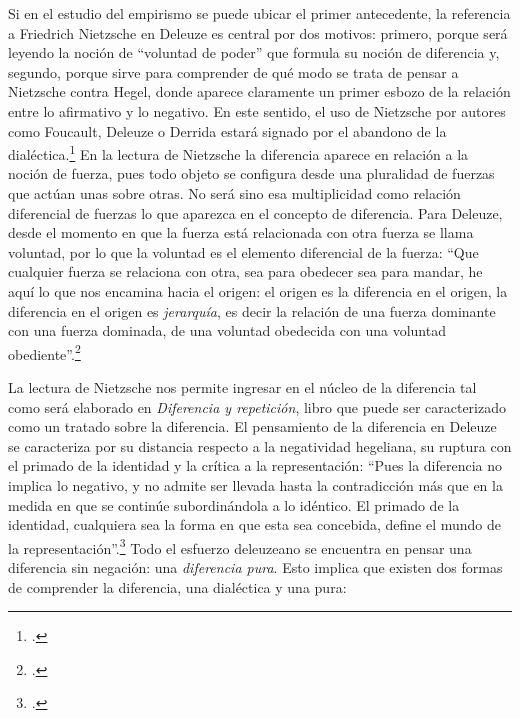 Si en el estudio del empirismo se puede ubicar el primer antecedente, la referencia a Friedrich Nietzsche en Deleuze es central por dos motivos: primero, porque será leyendo la noción de \enquote{voluntad de poder} que formula su noción de diferencia y, segundo, porque sirve para comprender de qué modo se trata de pensar a Nietzsche contra Hegel, donde aparece claramente un primer esbozo de la relación entre lo afirmativo y lo negativo. En este sentido, el uso de Nietzsche por autores como Foucault, Deleuze o Derrida estará signado por el abandono de la dialéctica.\footcite{@6971-SAZBON2009,@6972-CASTRO2002} En la lectura de Nietzsche la diferencia aparece en relación a la noción de fuerza, pues todo objeto se configura desde una pluralidad de fuerzas que actúan unas sobre otras. No será sino esa multiplicidad como relación diferencial de fuerzas lo que aparezca en el concepto de diferencia. Para Deleuze, desde el momento en que la fuerza está relacionada con otra fuerza se llama voluntad, por lo que la voluntad es el elemento diferencial de la fuerza: \enquote{Que cualquier fuerza se relaciona con otra, sea para obedecer sea para mandar, he aquí lo que nos encamina hacia el origen: el origen es la diferencia en el origen, la diferencia en el origen es \emph{jerarquía}, es decir la relación de una fuerza dominante con una fuerza dominada, de una voluntad obedecida con una voluntad obediente}.\footcites[16]{@6973-DELEUZE1998}[Indudablemente si en la noción de voluntad de poder se encuentra la genealogía de la diferencia deleuzeana, la repetición surge del eterno retorno: \enquote{(\dots) el eterno retorno se dice solamente del devenir, de lo múltiple. Es la ley de un mundo sin ser, sin unidad, sin identidad. Lejos de \emph{presuponer} lo Uno o lo Mismo, constituye la unidad exclusiva de lo múltiple en cuanto múltiple, la única identidad de lo que difiere: el volver es el único \enquote{ser} del devenir}.][163]{@6974-DELEUZE2005}

La lectura de Nietzsche nos permite ingresar en el núcleo de la diferencia tal como será elaborado en \emph{Diferencia y repetición}, libro que puede ser caracterizado como un tratado sobre la diferencia. El pensamiento de la diferencia en Deleuze se caracteriza por su distancia respecto a la negatividad hegeliana, su ruptura con el primado de la identidad y la crítica a la representación: \enquote{Pues la diferencia no implica lo negativo, y no admite ser llevada hasta la contradicción más que en la medida en que se continúe subordinándola a lo idéntico. El primado de la identidad, cualquiera sea la forma en que esta sea concebida, define el mundo de la representación}.\footcite[15]{@6961-DELEUZE2002} Todo el esfuerzo deleuzeano se encuentra en pensar una diferencia sin negación: una \emph{diferencia pura}. Esto implica que existen dos formas de comprender la diferencia, una dialéctica y una pura:

